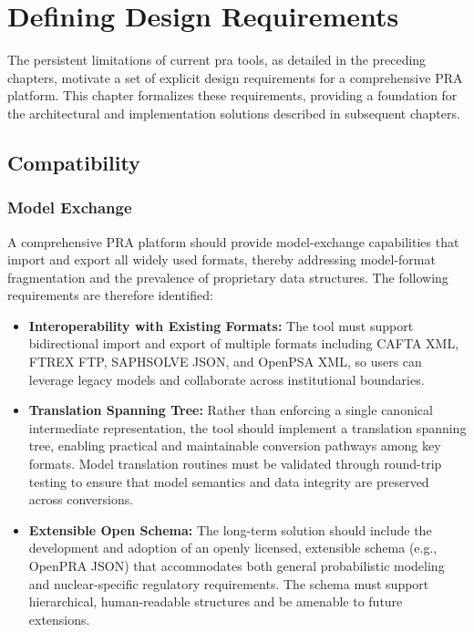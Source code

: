 \chapter{Defining Design Requirements}
\label{ch:design-requirements}

The persistent limitations of current \acrshort{pra} tools, as detailed in the preceding chapters, motivate a set of explicit design requirements for a comprehensive PRA platform. This chapter formalizes these requirements, providing a foundation for the architectural and implementation solutions described in subsequent chapters.

\section{Compatibility}
\label{sec:compatibility}

\subsection{Model Exchange}
\label{subsec:model-exchange}

A comprehensive PRA platform should provide model-exchange capabilities that import and export all widely used formats, thereby addressing model-format fragmentation and the prevalence of proprietary data structures. The following requirements are therefore identified:

\begin{itemize}
    \item \textbf{Interoperability with Existing Formats:} The tool must support bidirectional import and export of multiple formats including CAFTA XML, FTREX FTP, SAPHSOLVE JSON, and OpenPSA XML, so users can leverage legacy models and collaborate across institutional boundaries.
    \item \textbf{Translation Spanning Tree:} Rather than enforcing a single canonical intermediate representation, the tool should implement a translation spanning tree, enabling practical and maintainable conversion pathways among key formats. Model translation routines must be validated through round-trip testing to ensure that model semantics and data integrity are preserved across conversions.
    \item \textbf{Extensible Open Schema:} The long-term solution should include the development and adoption of an openly licensed, extensible schema (e.g., OpenPRA JSON) that accommodates both general probabilistic modeling and nuclear-specific regulatory requirements. The schema must support hierarchical, human-readable structures and be amenable to future extensions.
\end{itemize}

